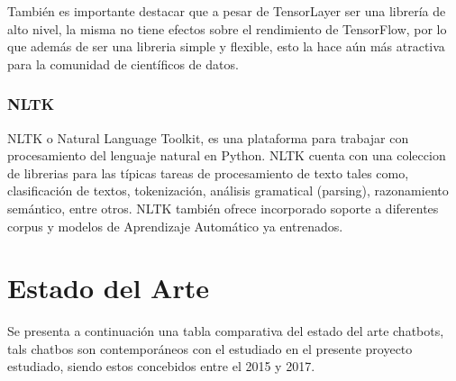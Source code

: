 \documentclass[12pt, letterpaper]{article}
\begin{document}
        También es importante destacar que a pesar de TensorLayer ser una librería de alto nivel, la misma no tiene efectos sobre el rendimiento de TensorFlow, por lo que además de ser una libreria  simple y flexible, esto la hace aún más atractiva para la comunidad de científicos de datos\cite{tensorlayer2017}.

        \subsubsection{NLTK}
        NLTK o Natural Language Toolkit, es una plataforma para trabajar con procesamiento del lenguaje natural en Python. NLTK cuenta con una coleccion de librerias para las típicas tareas de procesamiento de texto tales como, clasificación de textos, tokenización, análisis gramatical (parsing), razonamiento semántico, entre otros. NLTK también ofrece incorporado soporte a diferentes corpus y modelos de Aprendizaje Automático ya entrenados\cite{nltk}.

    \section{Estado del Arte}
    Se presenta a continuación una tabla comparativa del estado del arte chatbots, tals chatbos son contemporáneos con el estudiado en el presente proyecto estudiado, siendo estos concebidos entre el 2015 y 2017.
\end{document}
